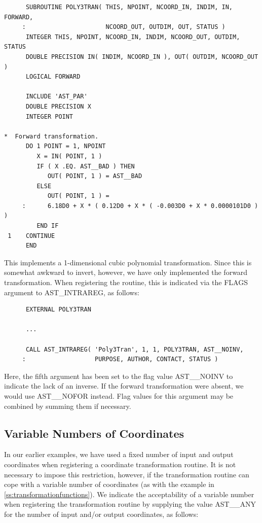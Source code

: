 \documentclass[twoside,11pt]{article}
\newcommand{\htmlref}[2]{#1}
\newcommand{\secref}[1]{\S\ref{#1}}
\renewcommand{\secref}[1]{\ref{#1}}
\begin{document}
\small
\begin{verbatim}
      SUBROUTINE POLY3TRAN( THIS, NPOINT, NCOORD_IN, INDIM, IN, FORWARD,
     :                      NCOORD_OUT, OUTDIM, OUT, STATUS )
      INTEGER THIS, NPOINT, NCOORD_IN, INDIM, NCOORD_OUT, OUTDIM, STATUS
      DOUBLE PRECISION IN( INDIM, NCOORD_IN ), OUT( OUTDIM, NCOORD_OUT )
      LOGICAL FORWARD

      INCLUDE 'AST_PAR'
      DOUBLE PRECISION X
      INTEGER POINT

*  Forward transformation.
      DO 1 POINT = 1, NPOINT
         X = IN( POINT, 1 )
         IF ( X .EQ. AST__BAD ) THEN
            OUT( POINT, 1 ) = AST__BAD
         ELSE
            OUT( POINT, 1 ) =
     :      6.18D0 + X * ( 0.12D0 + X * ( -0.003D0 + X * 0.0000101D0 ) )
         END IF
 1    CONTINUE
      END
\end{verbatim}
\normalsize

This implements a 1-dimensional cubic polynomial transformation. Since
this is somewhat awkward to invert, however, we have only implemented
the forward transformation.  When registering the routine, this is
indicated via the FLAGS argument to \htmlref{AST\_INTRAREG}{AST_INTRAREG}, as follows:

\small
\begin{verbatim}
      EXTERNAL POLY3TRAN

      ...

      CALL AST_INTRAREG( 'Poly3Tran', 1, 1, POLY3TRAN, AST__NOINV,
     :                   PURPOSE, AUTHOR, CONTACT, STATUS )
\end{verbatim}
\normalsize

Here, the fifth argument has been set to the flag value AST\_\_NOINV
to indicate the lack of an inverse. If the forward transformation were
absent, we would use AST\_\_NOFOR instead. Flag values for this
argument may be combined by summing them if necessary.

\subsection{\label{ss:variableintramapcoordinates}Variable Numbers of Coordinates}

In our earlier examples, we have used a fixed number of input and
output coordinates when registering a coordinate transformation
routine. It is not necessary to impose this restriction, however, if
the transformation routine can cope with a variable number of
coordinates (as with the example in
\secref{ss:transformationfunctions}). We indicate the acceptability of
a variable number when registering the transformation routine by
supplying the value AST\_\_ANY for the number of input and/or output
coordinates, as follows:
\end{document}
